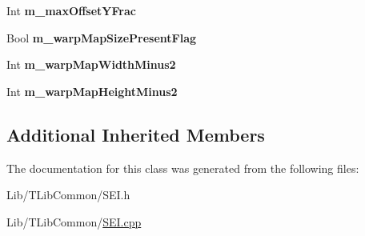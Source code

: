 \begin{DoxyCompactItemize}
Int {\bfseries m\+\_\+max\+Offset\+Y\+Frac}
\item 
\mbox{\label{class_s_e_i_alternative_depth_info_a7865c49f0f1b6c0aa9ac951f7a717006}} 
Bool {\bfseries m\+\_\+warp\+Map\+Size\+Present\+Flag}
\item 
\mbox{\label{class_s_e_i_alternative_depth_info_ac41d1608ac328bf7a33e13fa09e0ee90}} 
Int {\bfseries m\+\_\+warp\+Map\+Width\+Minus2}
\item 
\mbox{\label{class_s_e_i_alternative_depth_info_ae13cd9b602dcaae7ac6dacfd1e84a5ef}} 
Int {\bfseries m\+\_\+warp\+Map\+Height\+Minus2}
\end{DoxyCompactItemize}
\subsection*{Additional Inherited Members}


The documentation for this class was generated from the following files\+:\begin{DoxyCompactItemize}
\item 
Lib/\+T\+Lib\+Common/S\+E\+I.\+h\item 
Lib/\+T\+Lib\+Common/\hyperlink{_s_e_i_8cpp}{S\+E\+I.\+cpp}\end{DoxyCompactItemize}
